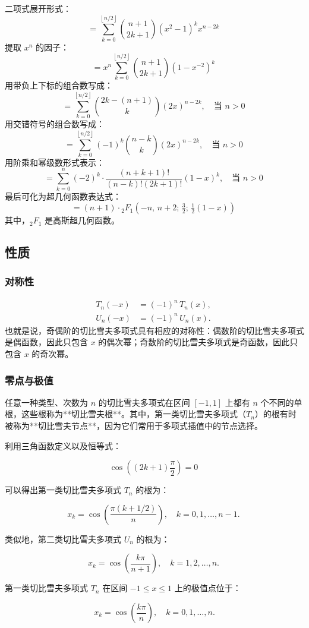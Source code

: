 二项式展开形式：
$$
= \sum_{k=0}^{\left\lfloor n/2 \right\rfloor} \binom{n+1}{2k+1} (x^2 - 1)^k x^{n - 2k}~
$$
提取 $x^n$ 的因子：
$$
= x^n \sum_{k=0}^{\left\lfloor n/2 \right\rfloor} \binom{n+1}{2k+1} \left(1 - x^{-2}\right)^k~
$$
用带负上下标的组合数写成：
$$
= \sum_{k=0}^{\left\lfloor n/2 \right\rfloor} \binom{2k - (n + 1)}{k} (2x)^{n - 2k}, \quad \text{当 } n > 0~
$$
用交错符号的组合数写成：
$$
= \sum_{k=0}^{\left\lfloor n/2 \right\rfloor} (-1)^k \binom{n - k}{k} (2x)^{n - 2k}, \quad \text{当 } n > 0~
$$
用阶乘和幂级数形式表示：
$$
= \sum_{k=0}^{n} (-2)^k \cdot \frac{(n + k + 1)!}{(n - k)! (2k + 1)!} (1 - x)^k, \quad \text{当 } n > 0~
$$
最后可化为超几何函数表达式：
$$
= (n + 1) \cdot {}_2F_1\left(-n,\, n + 2;\, \tfrac{3}{2};\, \tfrac{1}{2}(1 - x)\right)~
$$
其中，${}_2F_1$ 是高斯超几何函数。
\subsection{性质}
\subsubsection{对称性}
$$
\begin{aligned}
T_n(-x) &= (-1)^n\, T_n(x), \\
U_n(-x) &= (-1)^n\, U_n(x).
\end{aligned}~
$$
也就是说，奇偶阶的切比雪夫多项式具有相应的对称性：偶数阶的切比雪夫多项式是偶函数，因此只包含 $x$ 的偶次幂；奇数阶的切比雪夫多项式是奇函数，因此只包含 $x$ 的奇次幂。
\subsubsection{零点与极值}
任意一种类型、次数为 $n$ 的切比雪夫多项式在区间 $[−1, 1]$ 上都有 $n$ 个不同的单根，这些根称为**切比雪夫根**。其中，第一类切比雪夫多项式（$T_n$）的根有时被称为**切比雪夫节点**，因为它们常用于多项式插值中的节点选择。

利用三角函数定义以及恒等式：

$$
\cos\left((2k + 1)\frac{\pi}{2}\right) = 0~
$$

可以得出第一类切比雪夫多项式 $T_n$ 的根为：

$$
x_k = \cos\left(\frac{\pi(k + 1/2)}{n}\right),\quad k = 0, 1, \dots, n - 1.~
$$

类似地，第二类切比雪夫多项式 $U_n$ 的根为：

$$
x_k = \cos\left(\frac{k\pi}{n + 1}\right),\quad k = 1, 2, \dots, n.~
$$

第一类切比雪夫多项式 $T_n$ 在区间 $-1 \leq x \leq 1$ 上的极值点位于：

$$
x_k = \cos\left(\frac{k\pi}{n}\right),\quad k = 0, 1, \dots, n.
$$
